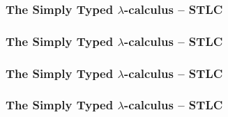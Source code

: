\begin{frame}
  \frametitle{The Simply Typed $\lambda$-calculus -- STLC}

\end{frame}

\begin{frame}
  \frametitle{The Simply Typed $\lambda$-calculus -- STLC}

\end{frame}

\begin{frame}
  \frametitle{The Simply Typed $\lambda$-calculus -- STLC}

\end{frame}

\begin{frame}
  \frametitle{The Simply Typed $\lambda$-calculus -- STLC}

\end{frame}
